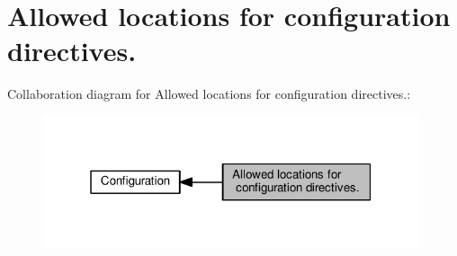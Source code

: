 \hypertarget{group__ConfigDirectives}{}\section{Allowed locations for configuration directives.}
\label{group__ConfigDirectives}
Collaboration diagram for Allowed locations for configuration directives.\+:
\nopagebreak
\begin{figure}[H]
\begin{center}
\leavevmode
\includegraphics[width=313pt]{group__ConfigDirectives}
\end{center}
\end{figure}
